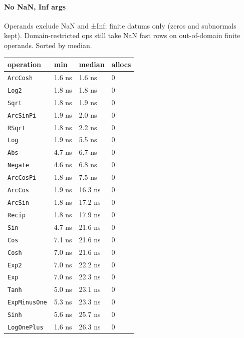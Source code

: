 


\paragraph{No NaN, Inf args}\indent



\label{16036960291186107490}{}


Operands exclude NaN and ±Inf; finite datums only (zeros and subnormals kept). Domain-restricted ops still take NaN fast rows on out-of-domain finite operands. Sorted by median.




\begin{table}[h]
\centering
\nopagebreak[3]
\begin{tabulary}{\linewidth}{L L L L}
\toprule
operation & min & median & allocs \\
\toprule
\texttt{ArcCosh} & 1.6 ns & 1.6 ns & 0 \\
\texttt{Log2} & 1.8 ns & 1.8 ns & 0 \\
\texttt{Sqrt} & 1.8 ns & 1.9 ns & 0 \\
\texttt{ArcSinPi} & 1.9 ns & 2.0 ns & 0 \\
\texttt{RSqrt} & 1.8 ns & 2.2 ns & 0 \\
\texttt{Log} & 1.9 ns & 5.5 ns & 0 \\
\texttt{Abs} & 4.7 ns & 6.7 ns & 0 \\
\texttt{Negate} & 4.6 ns & 6.8 ns & 0 \\
\texttt{ArcCosPi} & 1.8 ns & 7.5 ns & 0 \\
\texttt{ArcCos} & 1.9 ns & 16.3 ns & 0 \\
\texttt{ArcSin} & 1.8 ns & 17.2 ns & 0 \\
\texttt{Recip} & 1.8 ns & 17.9 ns & 0 \\
\texttt{Sin} & 4.7 ns & 21.6 ns & 0 \\
\texttt{Cos} & 7.1 ns & 21.6 ns & 0 \\
\texttt{Cosh} & 7.0 ns & 21.6 ns & 0 \\
\texttt{Exp2} & 7.0 ns & 22.2 ns & 0 \\
\texttt{Exp} & 7.0 ns & 22.3 ns & 0 \\
\texttt{Tanh} & 5.0 ns & 23.1 ns & 0 \\
\texttt{ExpMinusOne} & 5.3 ns & 23.3 ns & 0 \\
\texttt{Sinh} & 5.6 ns & 25.7 ns & 0 \\
\texttt{LogOnePlus} & 1.6 ns & 26.3 ns & 0 \\

\end{tabulary}
\end{table}
